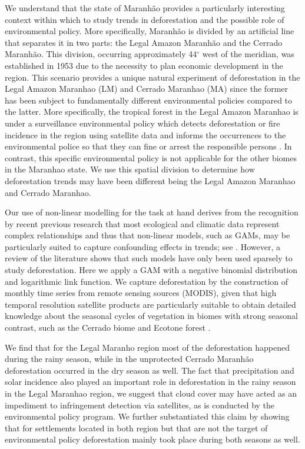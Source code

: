 We understand that the state of Maranhão provides a particularly interesting context within which to study trends in deforestation and the possible role of environmental policy. More specifically, Maranhão is divided by an artificial line that separates it in two parts: the Legal Amazon Maranhão and the Cerrado Maranhão. This division, occurring approximately 44$^{\circ}$ west of the meridian, was established in 1953 due to the necessity to plan economic development in the region. This scenario provides a unique natural experiment of deforestation in the Legal Amazon Maranhao (LM) and Cerrado Maranhao (MA) since the former has been subject to fundamentally different environmental policies compared to the latter. More specifically, the tropical forest in the Legal Amazon Maranhao is under a surveillance environmental policy which detects deforestation or fire incidence in the region using satellite data and informs the occurrences to the environmental police so that they can fine or arrest the responsible persons \citep{IBAMAwebsite}. In contrast, this specific environmental policy is not applicable for the other biomes in the Maranhao state. We use this spatial division to determine how deforestation trends may have been different being the Legal Amazon Maranhao and Cerrado Maranhao.

Our use of non-linear modelling for the task at hand derives from the recognition by recent previous research that most ecological and climatic data represent complex relationships and thus that non-linear models, such as GAMs, may be particularly suited to capture confounding effects in trends; see \citep{alkemad_1998,BELL_2015,JOYE_2015,LUSK_2016,SADAT_2016,HALPERIN_2016, SANTOS_2017,TAPIA_2017, LIU_2018,MORENO_2018}. However, a review of the literature shows that such models have only been used sparsely to study deforestation. Here we apply a GAM with a negative binomial distribution and logarithmic link function. We capture deforestation by the construction of monthly time series from remote sensing sources (MODIS), given that high temporal resolution satellite products are particularly suitable to obtain detailed knowledge about the seasonal cycles of vegetation in biomes with strong seasonal contrast, such as the Cerrado biome and Ecotone forest \citep{bayma_sano_2015}. 

We find that for the Legal Maranho region most of the deforestation happened during the rainy season, while in the unprotected Cerrado Maranhão deforestation occurred in the dry season as well. The fact that precipitation and solar incidence also played an important role in deforestation in the rainy season in the Legal Maranhao region, we suggest that cloud cover may have acted as an impediment to infringement detection via satellites, as is conducted by the environmental policy program. We further substantiated this claim by showing that for settlements located in both region but that are not the target of environmental policy deforestation mainly took place during both seasons as well.     

